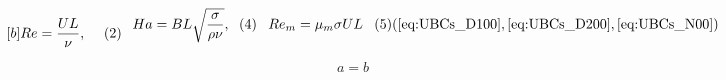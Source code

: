 \documentclass{article}
\begin{document}
\begin{subequations}
\setlength{\tabcolsep}{0pt}
\noindent\begin{minipage}{0.28\hsize}
\begin{equation}[b]\label{eq:UBCs_D100}
    Re = \frac{U L}{\nu},                       \notag
    \addtocounter{equation}{1}
\end{equation}
\end{minipage}\begin{minipage}[b]{0.28\hsize}
\begin{equation}\label{eq:UBCs_D200}
    Ha = B L \sqrt{\frac{\sigma}{\rho \nu}},    \notag
    \addtocounter{equation}{1}
\end{equation}
\end{minipage}\begin{minipage}[b]{0.28\hsize}
\vskip-5pt
\begin{equation} \label{eq:UBCs_N00}            \notag
    Re_m = \mu_{m} \sigma U L
\end{equation}
\end{minipage}
\hfill(\ref{eq:UBCs_D100},\ref{eq:UBCs_D200},\ref{eq:UBCs_N00})
\end{subequations}

\begin{equation} \label{eq:UBCs_N100}
    a = b
\end{equation}
    
\end{document}
